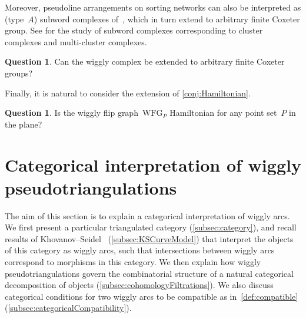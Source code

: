 \documentclass{amsart}
\theoremstyle{definition}
\newtheorem{question}[theorem]{Question}
\newcommand{\wigglyFlipGraph}{\mathrm{WFG}} %
\begin{document}
Moreover, pseudoline arrangements on sorting networks can also be interpreted as (type~$A$) subword complexes of~\cite{KnutsonMiller-subwordComplex}, which in turn extend to arbitrary finite Coxeter group.
See \cite{Stump, CeballosLabbeStump} for the study of subword complexes corresponding to cluster complexes and multi-cluster complexes.

\begin{question}
Can the wiggly complex be extended to arbitrary finite Coxeter groups?
\end{question}


Finally, it is natural to consider the extension of \cref{conj:Hamiltonian}.

\begin{question}
\label{qu:Hamiltonian}
Is the wiggly flip graph~$\wigglyFlipGraph_P$ Hamiltonian for any point set~$P$ in the plane?
\end{question}



\section{Categorical interpretation of wiggly pseudotriangulations}
\label{sec:categoricalInterpretation}

The aim of this section is to explain a categorical interpretation of wiggly arcs.
We first present a particular triangulated category (\cref{subsec:category}), and recall results of Khovanov--Seidel~\cite{kho.sei:02} (\cref{subsec:KSCurveModel}) that interpret the objects of this category as wiggly arcs, such that intersections between wiggly arcs correspond to morphisms in this category.
We then explain how wiggly pseudotriangulations govern the combinatorial structure of a natural categorical decomposition of objects (\cref{subsec:cohomologyFiltrations}).
We also discuss categorical conditions for two wiggly arcs to be compatible as in~\cref{def:compatible} (\cref{subsec:categoricalCompatibility}).
\end{document}
